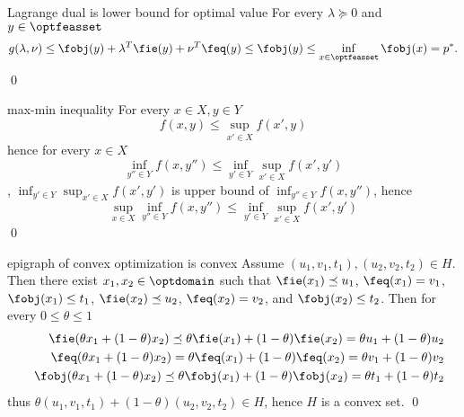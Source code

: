 \documentclass[17pt,landscape]{foils}
\def\ynindex{yes}
\def\ynindex{yes}
\def\ynindex{yes}
\def\ynindex{yes}
\def\ynindex{yes}
\def\ynindex{yes}
\def\ynindex{yes}
\def\ynindex{yes}
\def\ynindex{yes}
\def\ynindex{yes}
\begin{document}
{{{\begin{myproof}{Lagrange dual is lower bound for optimal value}
	For every $\lambda\succeq 0$ and $y\in\optfeasset$
	$$
		g(\lambda, \nu)
		\leq
		\fobj(y) + \lambda^T \fie(y) + \nu^T \feq(y)
		\leq
		\fobj(y)
		\leq
		\inf_{x\in\optfeasset} \fobj(x) = p^\ast.
	$$
	\qed
\end{myproof}

\begin{myproof}{max-min inequality}
	For every $x\in X, y\in Y$
	$$
		f(x,y) \leq \sup_{x'\in X} f(x',y)
	$$
	hence
	for every $x\in X$
	$$
		\inf_{y''\in Y} f(x,y'') \leq \inf_{y'\in Y} \sup_{x'\in X} f(x',y')
	$$
	\ie,
	$\inf_{y'\in Y} \sup_{x'\in X} f(x',y')$ is upper bound of $\inf_{y''\in Y} f(x,y'')$,
	hence
	$$
		\sup_{x\in X}\inf_{y''\in Y} f(x,y'') \leq \inf_{y'\in Y} \sup_{x'\in X} f(x',y')
	$$
	\qed\
\end{myproof}

\begin{myproof}{epigraph of convex optimization is convex}
	Assume $(u_1,v_1,t_1), (u_2,v_2,t_2)\in H$.
	Then there exist $x_1,x_2\in\optdomain$
	such that
	$\fie(x_1) \preceq u_1$,
	$\feq(x_1) = v_1$,
	$\fobj(x_1) \leq t_1$,
	$\fie(x_2) \preceq u_2$,
	$\feq(x_2) = v_2$,
	and
	$\fobj(x_2) \leq t_2$.
	Then for every $0\leq\theta\leq 1$
	\begin{eqnarray*}
	&&
	\fie(\theta x_1 + (1-\theta) x_2)
	\preceq \theta \fie(x_1) + (1-\theta) \fie(x_2)
	= \theta u_1 + (1-\theta) u_2
	\\&&
	\feq(\theta x_1 + (1-\theta) x_2)
	= \theta \feq(x_1) + (1-\theta) \feq(x_2)
	= \theta v_1 + (1-\theta) v_2
	\\&&
	\fobj(\theta x_1 + (1-\theta) x_2)
	\preceq \theta \fobj(x_1) + (1-\theta) \fobj(x_2)
	= \theta t_1 + (1-\theta) t_2
	\end{eqnarray*}
	thus
	$\theta (u_1,v_1,t_1) + (1-\theta) (u_2,v_2,t_2)\in H$,
	hence $H$ is a convex set. \qed\
\end{myproof}
}{}
\eit

}{}

}

\myfoilhead{}

%
%
%
%

%
%
%



\yesnoexec{\ynindex}{%
\TITLEFOIL{Index}{Index}

{
\small \printindex
}

}{}
\end{document}
